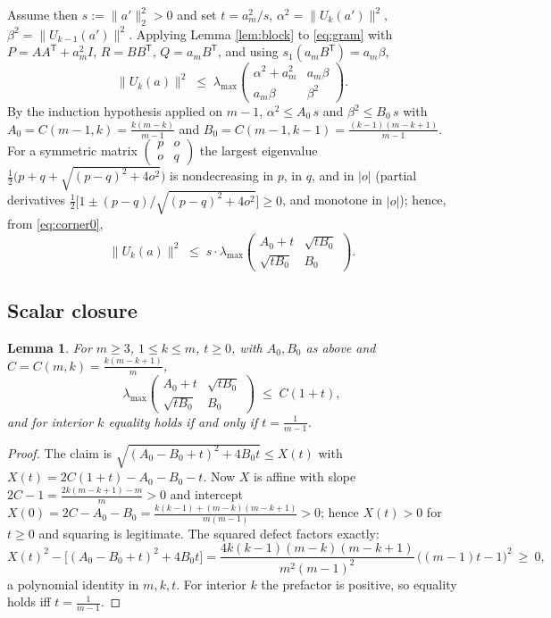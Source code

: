\documentclass[11pt]{article}
\newtheorem{lemma}[theorem]{Lemma}
\theoremstyle{remark}
\begin{document}
Assume then $s:=\|a'\|_2^2>0$ and set $t=a_m^2/s$,
$\alpha^2=\|U_k(a')\|^2$, $\beta^2=\|U_{k-1}(a')\|^2$.
Applying Lemma \ref{lem:block} to \eqref{eq:gram} with
$P=AA^{\mathsf T}+a_m^2 I$, $R=BB^{\mathsf T}$, $Q=a_m B^{\mathsf T}$,
and using $s_1(a_m B^{\mathsf T})=a_m\beta$,
\begin{equation}\label{eq:corner0}
\|U_k(a)\|^2\;\le\;\lambda_{\max}
\begin{pmatrix}\alpha^2+a_m^2& a_m\beta\\ a_m\beta&\beta^2\end{pmatrix}.
\end{equation}
By the induction hypothesis applied on $m-1$,
$\alpha^2\le A_0\,s$ and $\beta^2\le B_0\,s$ with
$A_0=C(m-1,k)=\frac{k(m-k)}{m-1}$ and
$B_0=C(m-1,k-1)=\frac{(k-1)(m-k+1)}{m-1}$.
For a symmetric matrix
$\begin{pmatrix} p & o\\ o & q\end{pmatrix}$ the largest eigenvalue
$\tfrac12\bigl(p+q+\sqrt{(p-q)^2+4o^2}\bigr)$ is nondecreasing in $p$,
in $q$, and in $|o|$ (partial derivatives
$\tfrac12\bigl[1\pm(p-q)/\sqrt{(p-q)^2+4o^2}\bigr]\ge0$, and monotone in
$|o|$); hence, from \eqref{eq:corner0},
\begin{equation}\label{eq:corner}
\|U_k(a)\|^2\;\le\; s\cdot
\lambda_{\max}\begin{pmatrix}A_0+t&\sqrt{tB_0}\\ \sqrt{tB_0}&B_0\end{pmatrix}.
\end{equation}

\subsection{Scalar closure}
\begin{lemma}\label{lem:closure}
For $m\ge3$, $1\le k\le m$, $t\ge0$, with $A_0,B_0$ as above and
$C=C(m,k)=\frac{k(m-k+1)}{m}$,
\[
\lambda_{\max}\begin{pmatrix}A_0+t&\sqrt{tB_0}\\ \sqrt{tB_0}&B_0\end{pmatrix}
\;\le\; C(1+t),
\]
and for interior $k$ equality holds if and only if $t=\frac1{m-1}$.
\end{lemma}
\begin{proof}
The claim is $\sqrt{(A_0-B_0+t)^2+4B_0t}\le X(t)$ with
$X(t)=2C(1+t)-A_0-B_0-t$. Now $X$ is affine with slope
$2C-1=\frac{2k(m-k+1)-m}{m}>0$ and intercept
$X(0)=2C-A_0-B_0=\frac{k(k-1)+(m-k)(m-k+1)}{m(m-1)}>0$; hence $X(t)>0$
for $t\ge0$ and squaring is legitimate. The squared defect factors
exactly:
\begin{equation}\label{eq:defect}
X(t)^2-\bigl[(A_0-B_0+t)^2+4B_0t\bigr]
=\frac{4k(k-1)(m-k)(m-k+1)}{m^2(m-1)^2}\,\bigl((m-1)t-1\bigr)^2\ \ge\ 0,
\end{equation}
a polynomial identity in $m,k,t$. For interior $k$ the prefactor is
positive, so equality holds iff $t=\frac1{m-1}$.
\end{proof}
\end{document}
